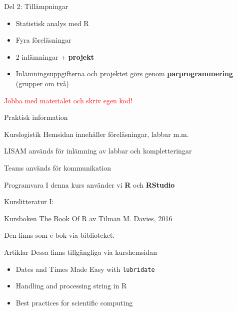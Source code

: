 \documentclass[
  10pt,
  ignorenonframetext,
]{beamer}
\providecommand{\tightlist}{%
  \setlength{\itemsep}{0pt}\setlength{\parskip}{0pt}}
\begin{document}
\begin{frame}{Del 2: Tillämpningar}
\protect\hypertarget{del-2-tilluxe4mpningar}{}
\begin{itemize}
\tightlist
\item
  Statistisk analys med R
\item
  Fyra föreläsningar
\item
  2 inlämningar + \textbf{projekt}
\item
  Inlämningsuppgifterna och projektet görs genom \textbf{parprogrammering} (grupper om två)
\end{itemize}

\pause

\textcolor{red}{Jobba med materialet och skriv egen kod!}
\end{frame}

\begin{frame}{Praktisk information}
\protect\hypertarget{praktisk-information}{}
\begin{block}{Kurslogistik}
\protect\hypertarget{kurslogistik}{}
Hemsidan innehåller föreläsningar, labbar m.m.

LISAM används för inlämning av labbar och kompletteringar

Teams används för kommunikation
\end{block}

\begin{block}{Programvara}
\protect\hypertarget{programvara}{}
I denna kurs använder vi \textbf{R} och \textbf{RStudio}
\end{block}
\end{frame}

\begin{frame}{Kurslitteratur I:}
\protect\hypertarget{kurslitteratur-i}{}
\begin{block}{Kursboken}
\protect\hypertarget{kursboken}{}
The Book Of R av Tilman M. Davies, 2016

Den finns som e-bok via biblioteket.
\end{block}

\begin{block}{Artiklar}
\protect\hypertarget{artiklar}{}
Dessa finns tillgängliga via kurshemsidan

\begin{itemize}
\tightlist
\item
  Dates and Times Made Easy with \texttt{lubridate}
\item
  Handling and processing string in R
\item
  Best practices for scientific computing
\end{itemize}
\end{block}
\end{frame}
\end{document}
